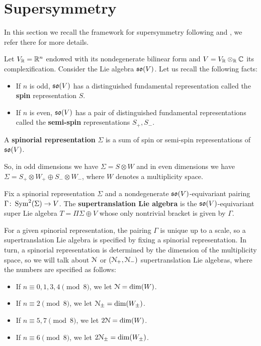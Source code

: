 \documentclass[10pt, oneside]{article}
\begin{document}
\section{Supersymmetry} \label{sec: susy}

In this section we recall the framework for supersymmetry following \cite{ElliottSafronov} and \cite{DeligneSpinors}, we refer there for more details.

Let $V_\mathbb R = \mathbb R^n$ endowed with its nondegenerate bilinear form and $V=V_\mathbb R\otimes_\mathbb R\mathbb C$ its complexification. Consider the Lie algebra $\mathfrak{so}(V)$. Let us recall the following facts:
\begin{itemize}
\item If $n$ is odd, $\mathfrak{so}(V)$ has a distinguished fundamental representation called the {\bf spin} representation $S$.

\item If $n$ is even, $\mathfrak{so}(V)$ has a pair of distinguished fundamental representations called the {\bf semi-spin} representations $S_+, S_-$.
\end{itemize}

\begin{definition}
A {\bf spinorial representation} $\Sigma$ is a sum of spin or semi-spin representations of $\mathfrak{so}(V)$.
\end{definition}

So, in odd dimensions we have $\Sigma=S\otimes W$ and in even dimensions we have $\Sigma=S_+\otimes W_+\oplus S_-\otimes W_-$, where $W$ denotes a multiplicity space.

\begin{definition}
Fix a spinorial representation $\Sigma$ and a nondegenerate $\mathfrak{so}(V)$-equivariant pairing $\Gamma\colon \operatorname{Sym}^2(\Sigma)\rightarrow V$. The {\bf supertranslation Lie algebra} is the $\mathfrak{so}(V)$-equivariant super Lie algebra $T=\Pi\Sigma\oplus V$ whose only nontrivial bracket is given by $\Gamma$.
\end{definition}

For a given spinorial representation, the pairing $\Gamma$ is unique up to a scale, so a supertranslation Lie algebra is specified by fixing a spinorial representation. In turn, a spinorial representation is determined by the dimension of the multiplicity space, so we will talk about $\mathcal{N}$ or $(\mathcal{N}_+, \mathcal{N}_-)$ supertranslation Lie algebras, where the numbers are specified as follows:
\begin{itemize}
\item If $n\equiv 0, 1, 3, 4\pmod 8$, we let $\mathcal{N} = \dim(W)$.

\item If $n\equiv 2 \pmod 8$, we let $\mathcal{N}_{\pm}=\dim(W_{\pm})$.

\item If $n\equiv 5, 7\pmod 8$, we let $2\mathcal{N} = \dim(W)$.

\item If $n\equiv 6\pmod 8$, we let $2\mathcal{N}_{\pm} = \dim(W_{\pm})$.
\end{itemize}
\end{document}
